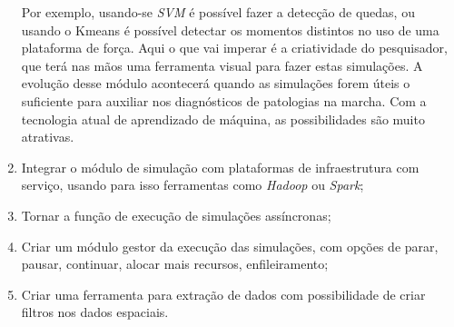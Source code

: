 \begin{enumerate}
Por exemplo, usando-se \emph{SVM} é possível fazer a detecção de quedas, ou usando o Kmeans é possível detectar os momentos distintos no uso de uma plataforma de força. 
Aqui o que vai imperar é a criatividade do pesquisador, que terá nas mãos uma ferramenta visual para fazer estas simulações. 
A evolução desse módulo acontecerá quando as simulações forem úteis o suficiente para auxiliar nos diagnósticos de patologias na marcha. 
Com a tecnologia atual de aprendizado de máquina, as possibilidades são muito atrativas.
	\item Integrar o módulo de simulação com plataformas de infraestrutura com serviço, usando para isso ferramentas como \emph{Hadoop} ou \emph{Spark};
	\item Tornar a função de execução de simulações assíncronas;
	\item Criar um módulo gestor da execução das simulações, com opções de parar, pausar, continuar, alocar mais recursos, enfileiramento;
	\item Criar uma ferramenta para extração de dados com possibilidade de criar filtros nos dados espaciais.
\end{enumerate}

